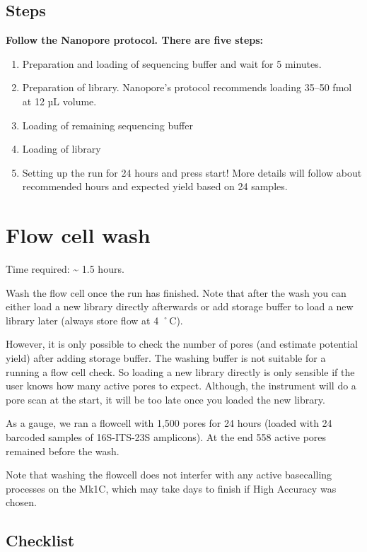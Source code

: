 \documentclass[
]{book}
\providecommand{\tightlist}{%
  \setlength{\itemsep}{0pt}\setlength{\parskip}{0pt}}
\begin{document}
\subsection{Steps}\label{steps-3}

\textbf{Follow the Nanopore protocol. There are five steps:}

\begin{enumerate}
\def\labelenumi{\arabic{enumi}.}
\tightlist
\item
  Preparation and loading of sequencing buffer and wait for 5 minutes.
\item
  Preparation of library. Nanopore's protocol recommends loading 35--50 fmol at 12 µL volume.
\item
  Loading of remaining sequencing buffer
\item
  Loading of library
\item
  Setting up the run for 24 hours and press start! More details will follow about recommended hours and expected yield based on 24 samples.
\end{enumerate}

\section{Flow cell wash}\label{flow-cell-wash}

Time required: \textasciitilde{} 1.5 hours.

Wash the flow cell once the run has finished. Note that after the wash you can either load a new library directly afterwards or add storage buffer to load a new library later (always store flow at 4 ˚C).

However, it is only possible to check the number of pores (and estimate potential yield) after adding storage buffer. The washing buffer is not suitable for a running a flow cell check. So loading a new library directly is only sensible if the user knows how many active pores to expect. Although, the instrument will do a pore scan at the start, it will be too late once you loaded the new library.

As a gauge, we ran a flowcell with 1,500 pores for 24 hours (loaded with 24 barcoded samples of 16S-ITS-23S amplicons). At the end 558 active pores remained before the wash.

Note that washing the flowcell does not interfer with any active basecalling processes on the Mk1C, which may take days to finish if High Accuracy was chosen.

\subsection{Checklist}\label{checklist-5}
\end{document}

